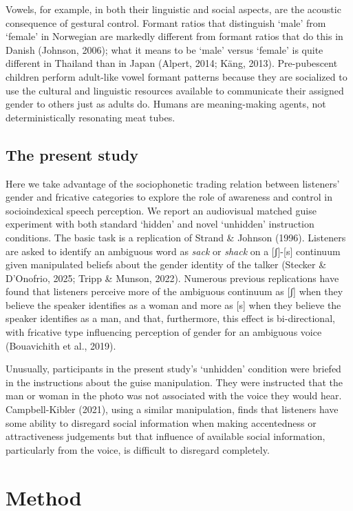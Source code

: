 \documentclass[
  letterpaper,
  DIV=11,
  numbers=noendperiod]{scrartcl}
\begin{document}
Vowels, for example, in both their linguistic and social aspects, are
the acoustic consequence of gestural control. Formant ratios that
distinguish `male' from `female' in Norwegian are markedly different
from formant ratios that do this in Danish (Johnson, 2006); what it
means to be `male' versus `female' is quite different in Thailand than
in Japan (Alpert, 2014; Käng, 2013). Pre-pubescent children perform
adult-like vowel formant patterns because they are socialized to use the
cultural and linguistic resources available to communicate their
assigned gender to others just as adults do. Humans are meaning-making
agents, not deterministically resonating meat tubes.

\subsection{The present study}\label{the-present-study}

Here we take advantage of the sociophonetic trading relation between
listeners' gender and fricative categories to explore the role of
awareness and control in socioindexical speech perception. We report an
audiovisual matched guise experiment with both standard `hidden' and
novel `unhidden' instruction conditions. The basic task is a replication
of Strand \& Johnson (1996). Listeners are asked to identify an
ambiguous word as \emph{sack} or \emph{shack} on a {[}ʃ{]}-{[}s{]}
continuum given manipulated beliefs about the gender identity of the
talker (Stecker \& D'Onofrio, 2025; Tripp \& Munson, 2022). Numerous
previous replications have found that listeners perceive more of the
ambiguous continuum as {[}ʃ{]} when they believe the speaker identifies
as a woman and more as {[}s{]} when they believe the speaker identifies
as a man, and that, furthermore, this effect is bi-directional, with
fricative type influencing perception of gender for an ambiguous voice
(Bouavichith et al., 2019).

Unusually, participants in the present study's `unhidden' condition were
briefed in the instructions about the guise manipulation. They were
instructed that the man or woman in the photo was not associated with
the voice they would hear. Campbell-Kibler (2021), using a similar
manipulation, finds that listeners have some ability to disregard social
information when making accentedness or attractiveness judgements but
that influence of available social information, particularly from the
voice, is difficult to disregard completely.

\section{Method}\label{sec-method}
\end{document}
